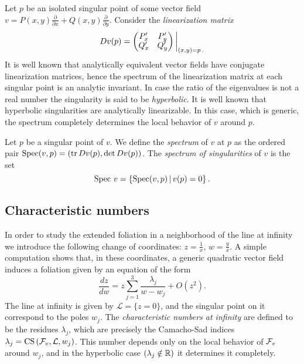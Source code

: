 \documentclass[phd,tocprelim]{cornell}
\begin{document}
Let $p$ be an isolated singular point of some vector field $v = P(x,y)\frac{\partial}{\partial x} + Q(x,y)\frac{\partial}{\partial y}$. Consider the \textit{linearization matrix}
 \[ Dv(p) = 
 \renewcommand*{\arraystretch}{0.65}
  \begin{pmatrix} 
   P'_x & P'_y \\
   Q'_x & Q'_y \\
  \end{pmatrix}\bigg\vert_{(x,y)=p\,.}  
   \]
It is well known that analytically equivalent vector fields have conjugate linearization matrices, hence the spectrum of the linearization matrix at each singular point is an analytic invariant. In case the ratio of the eigenvalues is not a real number the singularity is said to be \textit{hyperbolic}. It is well known that hyperbolic singularities are analytically linearizable. In this case, which is generic, the spectrum completely determines the local behavior of $v$ around $p$.

\begin{definition}
 Let $p$ be a singular point of $v$. We define the \textit{spectrum} of $v$ at $p$ as the ordered pair $\operatorname{Spec}(v,p) = (\operatorname{tr} Dv(p),\det Dv(p))$. The \textit{spectrum of singularities} of $v$ is the set 
  \[ \operatorname{Spec}\,v = \left\{{\operatorname{Spec}(v,p)}\,\vert\,{v(p)=0}\right\} . \]
\end{definition}


\subsection{Characteristic numbers}

In order to study the extended foliation in a neighborhood of the line at infinity we introduce the following change of coordinates: $z=\displaystyle\frac{1}{x}$, $w=\displaystyle\frac{y}{x}$. A simple computation shows that, in these coordinates, a generic quadratic vector field induces a foliation given by an equation of the form
 \[ \frac{dz}{dw} = z\sum_{j=1}^3 \frac{\lambda_j}{w-w_j} + O(z^2). \]
The line at infinity is given by $\mathcal{L}=\{z=0\}$, and the singular point on it correspond to the poles $w_j$. The \textit{characteristic numbers at infinity} are defined to be the residues $\lambda_j$, which are precisely the Camacho-Sad indices $\lambda_j=\operatorname{CS}\,(\mathcal{F}_v,\mathcal{L},w_j)$. This number depends only on the local behavior of $\mathcal{F}_v$ around $w_j$, and in the hyperbolic case $(\lambda_j\notin\mathbb{R})$ it determines it completely.
\end{document}

